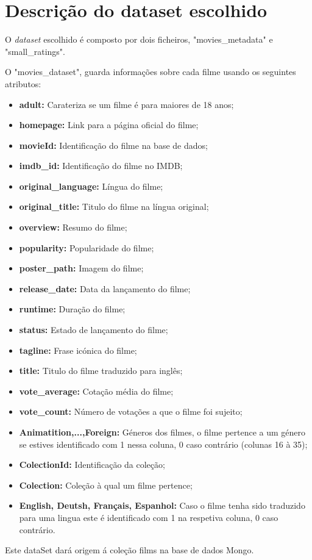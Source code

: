\section{Descrição do dataset escolhido}

O \textit{dataset} escolhido é composto por dois ficheiros, "movies\_metadata" e "small\_ratings". \newline

\par O "movies\_dataset", guarda informações sobre cada filme usando os seguintes atributos:

\begin{itemize}
    \item \textbf{adult:} Carateriza se um filme é para maiores de 18 anos;
    \item \textbf{homepage:} Link para a página oficial do filme;
    \item \textbf{movieId:} Identificação do filme na base de dados;
    \item \textbf{imdb\_id:} Identificação do filme no IMDB;
    \item \textbf{original\_language:} Língua do filme;
    \item \textbf{original\_title:} Titulo do filme na língua original;
    \item \textbf{overview:} Resumo do filme;
    \item \textbf{popularity:} Popularidade do filme;
    \item \textbf{poster\_path:} Imagem do filme;
    \item \textbf{release\_date:} Data da lançamento do filme;
    \item \textbf{runtime:} Duração do filme;
    \item \textbf{status:} Estado de lançamento do filme;
    \item \textbf{tagline:} Frase icónica do filme;
    \item \textbf{title:} Titulo do filme traduzido para inglês;
    \item \textbf{vote\_average:} Cotação média do filme;
    \item \textbf{vote\_count:} Número de votações a que o filme foi sujeito;
    \item \textbf{Animatition,...,Foreign:} Géneros dos filmes, o filme pertence a um género se estives identificado com 1 nessa coluna, 0 caso contrário (colunas 16 à 35);
    \item \textbf{ColectionId:} Identificação da coleção;
    \item \textbf{Colection:} Coleção à qual um filme pertence;
    \item \textbf{English, Deutsh, Français, Espanhol:} Caso o filme tenha sido traduzido para uma lingua este é identificado com 1 na respetiva coluna, 0 caso contrário.
    \end{itemize}
Este dataSet dará origem á coleção films na base de dados Mongo.    

